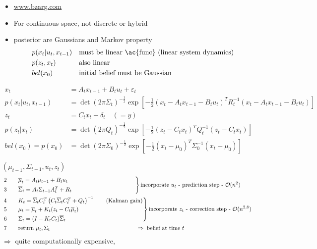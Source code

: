 \begin{itemize}
	\item {} \href{http://www.bzarg.com/p/how-a-kalman-filter-works-in-pictures/}{www.bzarg.com}
	\item For continuous space, not discrete or hybrid\\
	\item {} posterior are Gaussians and Markov property\\
	\begin{align*}
		&p(x_t | u_t, x_{t-1}) && \text{must be linear \ac{func} (linear system dynamics)}\\
		&p(z_t, x_t) && \text{also linear}\\
		&bel(x_0) && \text{initial belief must be Gaussian}
	\end{align*}
\end{itemize}

\begin{align*}
	x_t &= A_t x_{t-1} + B_t u_t + \varepsilon_t\\
	p(x_t | u_t, x_{t-1}) &= \det \left( 2\pi\Sigma_t \right)^{-\frac{1}{2}} \exp\left[ -\frac{1}{2} \left( x_t - A_t x_{t-1} - B_t u_t \right)^T R_t^{-1} \left( x_t - A_t x_{t-1} - B_t u_t \right) \right]\\
	z_t &= C_t x_t + \delta_t \quad(=y)\\
	p(z_t | x_t) &= \det \left( 2\pi Q_t \right)^{-\frac{1}{2}} \exp\left[ -\frac{1}{2} \left( z_t - C_t x_t \right)^T Q_t^{-1} \left( z_t - C_t x_t \right) \right]\\
	bel(x_0) = p(x_0) &= \det \left( 2\pi\Sigma_0 \right)^{-\frac{1}{2}} \exp\left[ -\frac{1}{2} \left( x_t - \mu_0 \right)^T \Sigma_0^{-1} \left( x_t - \mu_0 \right) \right]
\end{align*}

 $(\mu_{t-1}, \Sigma_{t-1}, u_t, z_t)$
\begin{align*}
	&\begin{rcases}
		2 \qquad \overline{\mu}_t = A_t \mu_{t-1} + B_t u_t\\
		3 \qquad \overline{\Sigma}_t = A_t \Sigma_{t-1} A_t^T + R_t \qquad\qquad\qquad\qquad\qquad\quad
	\end{rcases} \text{incorporate } u_t \text{ - prediction step - } \mathcal{O}(n^2)\\
	&\begin{rcases}
		4 \qquad K_t = \overline{\Sigma}_t C_t^T \left( C_t \overline{\Sigma}_t C_t^T + Q_t \right)^{-1} \qquad \text{(Kalman gain)}\\
		5 \qquad \mu_t = \overline{\mu}_t + K_t (z_t - C_t \overline{\mu}_t)\\
		6 \qquad \Sigma_t = (I - K_t C_t) \overline{\Sigma}_t
	\end{rcases} \text{incorporate } z_t \text{ - correction step - } \mathcal{O}(n^{2,8})\\
	&\;7 \qquad  \text{return } \mu_t, \Sigma_t \qquad\qquad\qquad\qquad\qquad\quad\qquad\qquad\Rightarrow\; \text{belief at time } t
\end{align*}
$\Rightarrow$ quite computationally expensive, 

